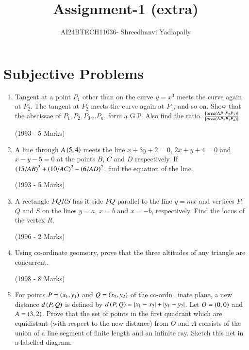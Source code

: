 \documentclass[journal,12pt,twocolumn]{IEEEtran}
\theoremstyle{remark}
\begin{document}
\renewcommand{\thefigure}{\theenumi}
\renewcommand{\thetable}{\theenumi}

\vspace{3cm}

\title{Assignment-1 (extra) }
\author{AI24BTECH11036- Shreedhanvi Yadlapally}
\maketitle
\newpage
\bigskip
\section{Subjective Problems}
\begin{enumerate}

	\item Tangent at a point $P_{1}$ {other than } on the curve $y=x^{3}$ meets the curve again at $P_{2}$. The tangent at $P_{2}$ meets the curve again at $P_{1}$, and so on. Show that the abscissae of $P_{1}, P_{2}, P_{3} \dots P_{n}$, form a G.P. Also find the ratio. $\frac{{}\left[area(\Delta P_{1}P_{2}P_{3})\right]}{{}\left[area(\Delta P_{2}P_{3}P_{4})\right]}$

	\hfill{(1993 - 5 Marks)}

\item A line through $A \left(5, 4\right)$ meets the line $x+3y+2=0$, $2x+y+4=0$ and $x-y-5=0$ at the points $B$, $C$ and $D$ respectively. If $\left(15/AB\right)^{2}+\left(10/AC\right)^{2}-\left(6/AD\right)^{2}$, find the equation of the line.

	\hfill{(1993 - 5 Marks)}

\item A rectangle $PQRS$ has it side $PQ$ parallel to the line $y=mx$ 
and vertices $P$, $Q$ and $S$ on the lines $y=a$, $x=b$ and $x=-b$, 
respectively. Find the locus of the vertex $R$.
	
		\hfill{(1996 - 2 Marks)}

\item Using co-ordinate geometry, prove that the three altitudes of any triangle are concurrent.

	\hfill{(1998 - 8 Marks)}

\item For points $P=\left(x_{1}, y_{1}\right)$ and $Q=\left(x_{2}, y_{2}\right)$ of the co-ordn=inate plane, a new distance $d\left(P, Q\right)$ is defined by $d\left(P, Q\right)=\left\vert x_{1}-x_{2}\right\vert+\left\vert y_{1}-y_{2}\right\vert$. Let $O=\left(0, 0\right)$ and $A=\left(3, 2\right)$. Prove that the set of points in the first quadrant which are equidistant (with respect to the new distance) from $O$ and $A$ consists of the union of a line segment of finite length and an infinite ray. Sketch this net in a labelled diagram.


\end{enumerate}
\end{document}
